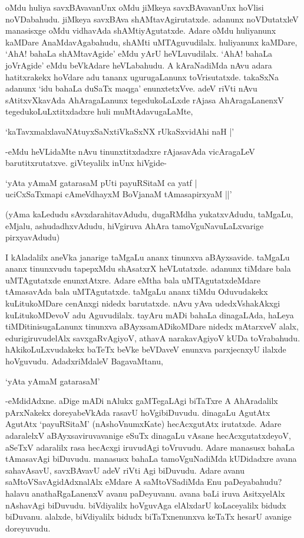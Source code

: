 oMdu huliya savxBAvavanUnx oMdu jiMkeya savxBAvavanUnx hoVlisi noVDabahudu. jiMkeya savxBAva shAMtavAgirutatxde. adanunx noVDutatxleV manasisxge oMdu vidhavAda shAMtiyAgutatxde. Adare oMdu huliyanunx kaMDare AnaMdavAgabahudu, shAMti uMTAguvudilalx. huliyanunx kaMDare, `AhA! bahaLa shAMtavAgide' eMdu yArU heVLuvudilalx. `AhA! bahaLa joVrAgide' eMdu beVkAdare heVLabahudu. A kAraNadiMda nAvu adara hatitxrakekx hoVdare adu tananx ugurugaLanunx toVrisutatxde. takaSxNa adanunx `idu bahaLa duSaTx maqga' enunxtetxVve. adeV riVti nAvu sAtitxvXkavAda AhAragaLanunx tegedukoLaLxde rAjasa AhAragaLanenxV tegedukoLuLxtitxdadxre huli muMtAdavugaLaMte,


\begin{shloka}
`kaTavxmalxlavaNAtuyxSaNxtiVkaSxNX rUkaSxvidAhi naH |'
\end{shloka}

-eMdu heVLidaMte nAvu tinunxtitxdadxre rAjasavAda vicAragaLeV barutitxrutatxve. giVteyalilx inUnx hiVgide-

\begin{shloka}
`yAta yAmaM gatarasaM pUti payuRSitaM ca yatf |\\
uciCxSaTxmapi cAmeVdhayxM BoVjanaM tAmasapirxyaM ||'
\end{shloka}

(yAma kaLedudu sAvxdarahitavAdudu, dugaRMdha yukatxvAdudu, taMgaLu, eMjalu, ashudadhxvAdudu, hiVgiruva AhAra tamoVguNavuLaLxvarige pirxyavAdudu)

I kAladalilx aneVka janarige taMgaLu ananx tinunxva aBAyxsavide. taMgaLu ananx tinunxvudu tapepxMdu shAsatxrX heVLutatxde. adanunx tiMdare bala uMTAgutatxde enunxtAtxre. Adare eMtha bala uMTAgutatxdeMdare tAmasavAda bala uMTAgutatxde. taMgaLu ananx tiMdu Oduvudakekx kuLitukoMDare cenAnxgi nidedx barutatxde. nAvu yAva udedxVshakAkxgi kuLitukoMDevoV adu Aguvudilalx. tayAru mADi bahaLa dinagaLAda, haLeya tiMDitinisugaLanunx tinunxva aBAyxsamADikoMDare nidedx mAtarxveV alalx, edurigiruvudelAlx savxgaRvAgiyoV, athavA narakavAgiyoV kUDa toVrabahudu. hAkikoLuLxvudakekx baTeTx beVke beVDaveV enunxva parxjecnxyU ilalxde hoVguvudu. AdadxriMdaleV BagavaMtanu,

\begin{shloka}
`yAta yAmaM gatarasaM'
\end{shloka}


-eMdidAdxne. aDige mADi nAlukx gaMTegaLAgi biTaTxre A AhAradalilx pArxNakekx doreyabeVkAda rasavU hoVgibiDuvudu. dinagaLu AgutAtx AgutAtx `payuRSitaM' (nAshoVnumxKate) hecAcxgutAtx irutatxde. Adare adaralelxV aBAyxsaviruvavanige eSuTx dinagaLu vAsane hecAcxgutatxdeyoV, aSeTxV adaralilx rasa hecAcxgi iruvudAgi toVruvudu. Adare manasusx bahaLa tAmasavAgi biDuvudu. manasusx bahaLa tamoVguNadiMda kUDidadxre avana sahavAsavU, savxBAvavU adeV riVti Agi biDuvudu. Adare avanu saMtoVSavAgidAdxnalAlx eMdare A saMtoVSadiMda Enu paDeyabahudu? halavu anathaRgaLanenxV avanu paDeyuvanu. avana baLi iruva AsitxyelAlx nAshavAgi biDuvudu. biVdiyalilx hoVguvAga elAlxdarU koLaceyalilx bidudx biDuvanu. alalxde, biVdiyalilx bidudx biTaTxnenunxva keTaTx hesarU avanige doreyuvudu.


